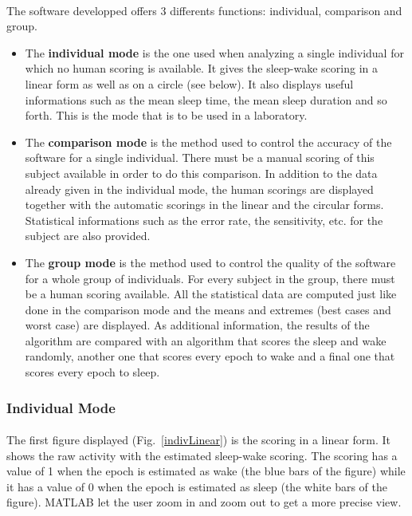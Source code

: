 \documentclass[a4paper,12pt]{article}
\begin{document}
\paragraph{}
The software developped offers 3 differents functions: individual, comparison and group. 
\begin{itemize}
\item The \textbf{individual mode} is the one used when analyzing a single individual for which no human scoring is available. It gives the sleep-wake scoring in a linear form as well as on a circle (see below). It also displays useful informations such as the mean sleep time, the mean sleep duration and so forth. This is the mode that is to be used in a laboratory.

\item The \textbf{comparison mode} is the method used to control the accuracy of the software for a single individual. There must be a manual scoring of this subject available in order to do this comparison. In addition to the data already given in the individual mode, the human scorings are displayed together with the automatic scorings in the linear and the circular forms. Statistical informations such as the error rate, the sensitivity, etc. for the subject are also provided.

\item The \textbf{group mode} is the method used to control the quality of the software for a whole group of individuals. For every subject in the group, there must be a human scoring available. All the statistical data are computed just like done in the comparison mode and the means and extremes (best cases and worst case) are displayed. As additional information, the results of the algorithm are compared with an algorithm that scores the sleep and wake randomly, another one that scores every epoch to wake and a final one that scores every epoch to sleep.

\end{itemize}

\subsubsection{Individual Mode}

\paragraph{}
The first figure displayed (Fig.~\ref{indivLinear}) is the scoring in a linear form. It shows the raw activity with the estimated sleep-wake scoring. The scoring has a value of 1 when the epoch is estimated as wake (the blue bars of the figure) while it has a value of 0 when the epoch is estimated as sleep (the white bars of the figure). MATLAB let the user zoom in and zoom out to get a more precise view. 
\end{document}
